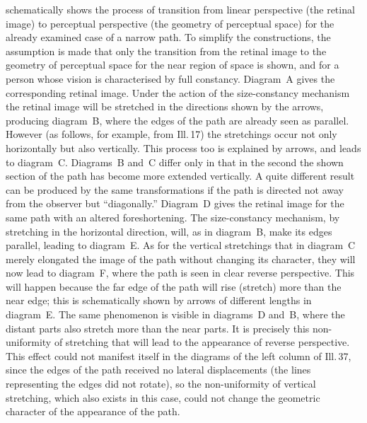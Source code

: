 
schematically shows the process of transition from linear perspective (the retinal
image) to perceptual perspective (the geometry of perceptual space) for the already
examined case of a narrow path.  To simplify the constructions, the assumption is
made that only the transition from the retinal image to the geometry of perceptual
space for the near region of space is shown, and for a person whose vision is
characterised by full constancy.  Diagram~A gives the corresponding retinal image.
Under the action of the size-constancy mechanism the retinal image will be stretched
in the directions shown by the arrows, producing diagram~B, where the edges of the
path are already seen as parallel.  However (as follows, for example, from Ill.\,17)
the stretchings occur not only horizontally but also vertically.  This process too is
explained by arrows, and leads to diagram~C.  Diagrams~B and~C differ only in that
in the second the shown section of the path has become more extended vertically.  A
quite different result can be produced by the same transformations if the path is
directed not away from the observer but ``diagonally.''  Diagram~D gives the retinal
image for the same path with an altered foreshortening.  The size-constancy
mechanism, by stretching in the horizontal direction, will, as in diagram~B, make its
edges parallel, leading to diagram~E.  As for the vertical stretchings that in
diagram~C merely elongated the image of the path without changing its character,
they will now lead to diagram~F, where the path is seen in clear reverse perspective.
This will happen because the far edge of the path will rise (stretch) more than the
near edge; this is schematically shown by arrows of different lengths in diagram~E.
The same phenomenon is visible in diagrams~D and~B, where the distant parts also
stretch more than the near parts.  It is precisely this non-uniformity of stretching
that will lead to the appearance of reverse perspective.  This effect could not
manifest itself in the diagrams of the left column of Ill.\,37, since the edges of
the path received no lateral displacements (the lines representing the edges did not
rotate), so the non-uniformity of vertical stretching, which also exists in this
case, could not change the geometric character of the appearance of the path.



